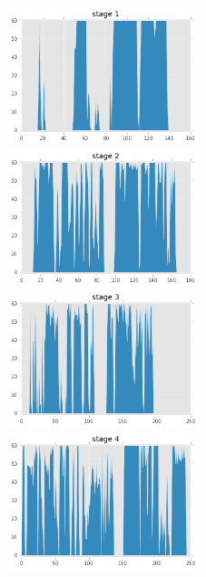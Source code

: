 \documentclass[UTF8]{ctexart}
\begin{document}
\begin{figure}[H]
\begin{minipage}[t]{0.5\linewidth}
\centering
\includegraphics[width=2.2in]{images/pressingShift1.png}
\end{minipage}
\begin{minipage}[t]{0.5\linewidth}
\centering
\includegraphics[width=2.2in]{images/pressingShift2.png}
\end{minipage}
\begin{minipage}[t]{0.5\linewidth}
\centering
\includegraphics[width=2.2in]{images/pressingShift3.png}
\end{minipage}
\begin{minipage}[t]{0.5\linewidth}
\centering
\includegraphics[width=2.2in]{images/pressingShift4.png}
\end{minipage}
\begin{minipage}[t]{0.5\linewidth}

\end{minipage}
\end{figure}
\end{document}
